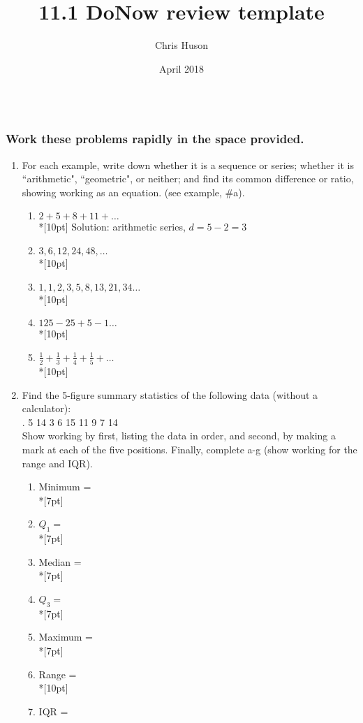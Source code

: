 \documentclass[12pt, oneside]{article}
\title{11.1 DoNow review template}
\author{Chris Huson}
\date{April 2018}
\begin{document}
\subsubsection*{\\ \textnormal{Work these problems rapidly in the space provided.}}

\begin{enumerate}
\item For each example, write down whether it is a sequence or series; whether it is ``arithmetic", ``geometric", or neither; and find its common difference or ratio, showing working as an equation. (see example, \#a).
\begin{enumerate}
    \item $2+5+8+11+\dots$\\*[10pt]
    Solution: arithmetic series, $d=5-2=3$
    \item $3, 6, 12, 24, 48, \dots$\\*[10pt]
    \item $1, 1, 2, 3, 5,8,13,21,34 \dots$\\*[10pt]
    \item $125-25+5-1 \dots$\\*[10pt]
    \item $\displaystyle \frac{1}{2}+\frac{1}{3}+\frac{1}{4}+\frac{1}{5}+ \dots$\\*[10pt]
\end{enumerate}


\item Find the 5-figure summary statistics of the following data (without a calculator):\\ .\hspace{4cm} 5 14 3 6 15 11 9 7 14\\
Show working by first, listing the data in order, and second, by making a mark at each of the five positions. Finally, complete a-g (show working for the range and IQR).
\begin{enumerate}
    \item Minimum = \\*[7pt]
    \item $Q_1 =$\\*[7pt]
    \item Median = \\*[7pt]
    \item $Q_3 =$\\*[7pt]
    \item Maximum = \\*[7pt]
    \item Range =\\*[10pt]
    \item IQR = 
\end{enumerate}

\end{enumerate}
\end{document}
